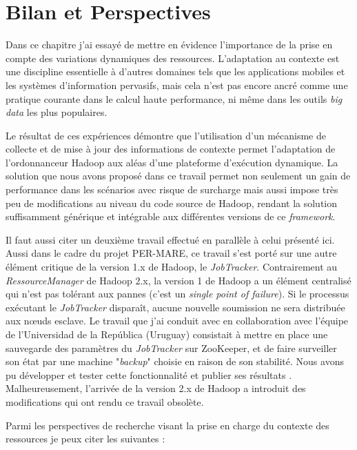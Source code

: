 \section{Bilan et Perspectives} \label{sec:disc}

Dans ce chapitre j'ai essayé de mettre en évidence l'importance de la prise en compte des variations dynamiques des ressources. L'adaptation au contexte est une discipline essentielle à d'autres domaines tels que les applications mobiles et  les systèmes d'information pervasifs, mais cela n'est pas encore ancré comme une pratique courante dans le calcul haute performance, ni même dans les outils \textit{big data} les plus populaires. 

Le résultat de ces expériences démontre que l'utilisation d'un mécanisme de collecte et de mise à jour des informations de contexte permet l'adaptation de l'ordonnanceur Hadoop aux aléas d'une plateforme d'exécution dynamique. La solution que nous avons proposé dans ce travail permet non seulement un gain de performance dans les scénarios avec risque de surcharge mais aussi impose très peu de modifications au niveau du code source de Hadoop, rendant la solution suffisamment générique et intégrable aux différentes versions de ce \textit{framework}. 

Il faut aussi citer un deuxième travail effectué en parallèle à celui présenté ici. Aussi dans le cadre du projet PER-MARE, ce travail s'est porté sur une autre élément critique de la version 1.x de Hadoop, le \textit{JobTracker}. Contrairement au \textit{RessourceManager} de Hadoop 2.x, la version 1 de Hadoop a un élément centralisé qui n'est pas tolérant aux pannes (c'est un \textit{single point of failure}). Si le processus exécutant le \textit{JobTracker} disparaît, aucune nouvelle soumission ne sera distribuée aux n{\oe}uds esclave. Le travail que j'ai conduit avec en collaboration avec l'équipe de l'Universidad de la República (Uruguay) consistait à mettre en place une sauvegarde des paramètres du \textit{JobTracker} sur ZooKeeper, et de faire surveiller son état par une machine "\textit{backup}" choisie en raison de son stabilité. Nous avons pu développer et tester cette fonctionnalité et publier ses résultats \cite{Steffenel2015-WoC, Rey14a}. Malheureusement, l'arrivée de la version 2.x de Hadoop a introduit des modifications qui ont rendu ce travail obsolète. 

Parmi les perspectives de recherche visant la prise en charge du contexte des ressources je peux citer les suivantes :


